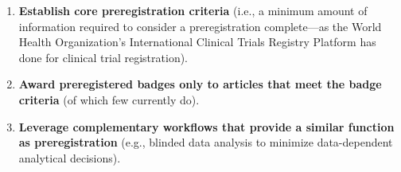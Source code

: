 \documentclass[authordate, meta]{jote-new-article}
\begin{document}
\begin{fullwidth}
  \begin{enumerate}[leftmargin=!,itemindent=0pt]

    \item \textbf{Establish core preregistration criteria }(i.e., a minimum amount of information required to consider a preregistration complete—as the World Health Organization’s International Clinical Trials Registry Platform has done for clinical trial registration).


    \item \textbf{Award preregistered badges only to articles that meet the badge criteria }(of which few currently do).


    \item \textbf{Leverage complementary workflows that provide a similar function as preregistration }(e.g., blinded data analysis to minimize data-dependent analytical decisions).


  \end{enumerate}
\end{fullwidth}
\end{document}
